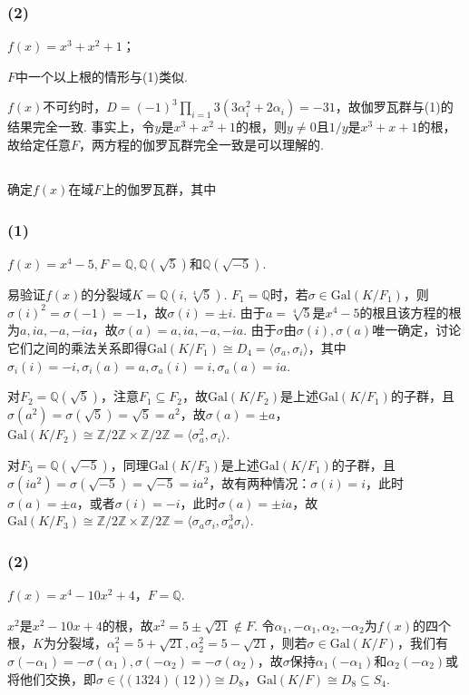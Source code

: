 \subsubsection{(2)}
$f(x)=x^3+x^2+1$；

\jie $F$中一个以上根的情形与(1)类似.

$f(x)$不可约时，$D=(-1)^3\prod_{i=1}{3}(3\alpha_i^2+2\alpha_i)=-31$，故伽罗瓦群与(1)的结果完全一致. 事实上，令$y$是$x^3+x^2+1$的根，则$y\neq 0$且$1/y$是$x^3+x+1$的根，故给定任意$F$，两方程的伽罗瓦群完全一致是可以理解的.

\subsection{}
确定$f(x)$在域$F$上的伽罗瓦群，其中
\subsubsection{(1)}
$f(x)=x^4-5, F=\mathbb{Q}, \mathbb{Q}(\sqrt{5})$和$\mathbb{Q}(\sqrt{-5})$.

\jie 易验证$f(x)$的分裂域$K=\mathbb{Q}(i,\sqrt[4]{5})$. $F_1=\mathbb{Q}$时，若$\sigma\in\mathrm{Gal}(K/F_1)$，则$\sigma(i)^2=\sigma(-1)=-1$，故$\sigma(i)=\pm i$.
由于$a=\sqrt[4]{5}$是$x^4-5$的根且该方程的根为$a,ia,-a,-ia$，故$\sigma(a)=a,ia,-a,-ia$. 由于$\sigma$由$\sigma(i),\sigma(a)$唯一确定，讨论它们之间的乘法关系即得$\mathrm{Gal}(K/F_1)\cong D_4=\langle \sigma_a, \sigma_i\rangle$，其中$\sigma_i(i)=-i,\sigma_i(a)=a, \sigma_a(i)=i, \sigma_a(a)=ia$.

对$F_2=\mathbb{Q}(\sqrt{5})$，注意$F_1\subseteq F_2$，故$\mathrm{Gal}(K/F_2)$是上述$\mathrm{Gal}(K/F_1)$的子群，且$\sigma(a^2)=\sigma(\sqrt{5})=\sqrt{5}=a^2$，故$\sigma(a)=\pm a$，$\mathrm{Gal}(K/F_2)\cong\mathbb{Z}/2\mathbb{Z}\times\mathbb{Z}/2\mathbb{Z}=\langle \sigma_a^2, \sigma_i\rangle$.

对$F_3=\mathbb{Q}(\sqrt{-5})$，同理$\mathrm{Gal}(K/F_3)$是上述$\mathrm{Gal}(K/F_1)$的子群，且$\sigma(ia^2)=\sigma(\sqrt{-5})=\sqrt{-5}=ia^2$，故有两种情况：$\sigma(i)=i$，此时$\sigma(a)=\pm a$，或者$\sigma(i)=-i$，此时$\sigma(a)=\pm ia$，故$\mathrm{Gal}(K/F_3)\cong\mathbb{Z}/2\mathbb{Z}\times\mathbb{Z}/2\mathbb{Z}=\langle \sigma_a\sigma_i, \sigma_a^3\sigma_i \rangle$.

\subsubsection{(2)}
$f(x)=x^4-10x^2+4$，$F=\mathbb{Q}$.

\jie $x^2$是$x^2-10x+4$的根，故$x^2=5\pm\sqrt{21}\notin F$. 令$\alpha_1,-\alpha_1,\alpha_2,-\alpha_2$为$f(x)$的四个根，$K$为分裂域，$\alpha_1^2=5+\sqrt{21},\alpha_2^2=5-\sqrt{21}$，则若$\sigma\in\mathrm{Gal}(K/F)$，我们有$\sigma(-\alpha_1)=-\sigma(\alpha_1), \sigma(-\alpha_2)=-\sigma(\alpha_2)$，故$\sigma$保持$\alpha_1(-\alpha_1)$和$\alpha_2(-\alpha_2)$或将他们交换，即$\sigma\in\langle (1324)(12)\rangle\cong D_8$，$\mathrm{Gal}(K/F)\cong D_8\subseteq S_4$.

